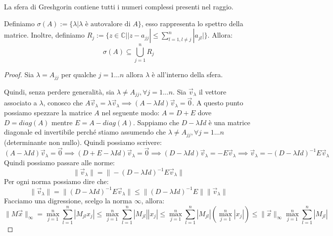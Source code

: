 La sfera di Greshgorin contiene tutti i numeri complessi presenti nel raggio.

\begin{teorema} 
    Definiamo $\sigma(A):=\{\lambda | \lambda\text{ è autovalore di }A\}$, esso
    rappresenta lo spettro della matrice. Inoltre, definiamo $R_j:=\{z\in \mathbb{C}|
        |z-a_{jj}| \leq \sum_{l=1, l\neq j}^{n} |a_{jl}|\}$.
    Allora:
    \begin{equation*}
        \sigma(A) \subseteq \bigcup_{j=1}^{n} R_j
    \end{equation*}
    \begin{proof}
        Sia $\lambda = A_{jj}$ per qualche $j = 1 \dots n$ allora $\lambda$ è
        all'interno della sfera.

        Quindi, senza perdere generalità, sia $\lambda \neq A_{jj}, \forall j= 1 \dots n$.
        Sia $\vec{v}_\lambda$ il vettore associato a $\lambda$, conosco che
        $A \vec{v}_\lambda = \lambda \vec{v}_\lambda \implies (A - \lambda Id)
            \vec{v}_\lambda = \vec{0}$. A questo punto possiamo spezzare la matrice
        $A$ nel seguente modo: $A = D + E$ dove $D = diag(A)$ mentre $E = A - diag(A)$.
        Sappiamo che $D - \lambda Id$ è una matrice diagonale ed invertibile
        perché stiamo assumendo che $\lambda \neq A_{jj}, \forall j = 1 \dots n$ (determinante non nullo).
        Quindi possiamo scrivere:
        \begin{equation*}
            (A - \lambda Id)\vec{v}_\lambda = \vec{0} \implies (D + E - \lambda
            Id)\vec{v}_\lambda = \vec{0} \implies (D - \lambda Id)\vec{v}_\lambda
            = - E\vec{v}_\lambda \implies \vec{v}_\lambda = -(D - \lambda Id)^{-1}
            E\vec{v}_\lambda
        \end{equation*}
        Quindi possiamo passare alle norme:
        \begin{equation*}
            \|\vec{v}_\lambda\| = \|-(D - \lambda Id)^{-1}E\vec{v}_\lambda\|
        \end{equation*}
        Per ogni norma possiamo dire che:
        \begin{equation*}
            \|\vec{v}_\lambda\| = \|(D - \lambda Id)^{-1}E\vec{v}_\lambda\| \leq
            \|(D - \lambda Id)^{-1}E\| \|\vec{v}_\lambda\|
        \end{equation*}
        Facciamo una digressione, scelgo la norma $\infty$, allora:
        \begin{equation*}
            \|M\vec{x}\|_\infty = \max_{j = 1}^n \sum_{l = 1}^{n}|M_{jl}x_j| \leq
            \max_{j = 1}^n\sum_{l = 1}^{n}|M_{jl}||x_j|\leq \max_{j = 1}^n
            \sum_{l = 1}^{n}|M_{jl}|(\max_{j = 1}^n|x_j|)\leq \|\vec{x}\|_\infty
            \max_{j = 1}^n\sum_{l = 1}^{n}|M_{jl}|
        \end{equation*}


\end{proof}
\end{teorema}
